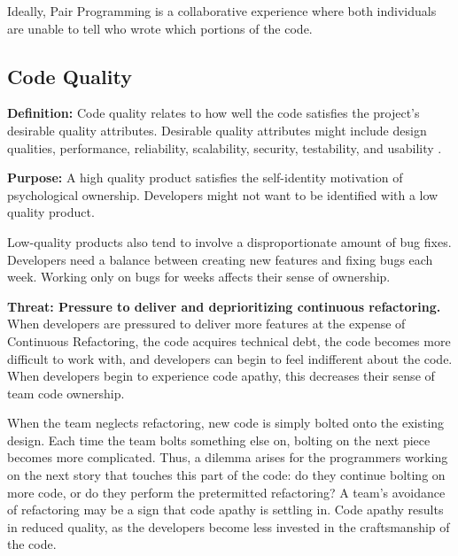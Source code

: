 

Ideally, Pair Programming is a collaborative experience where both individuals are unable to tell who wrote which portions of the code. 

\subsection{Code Quality}
\textbf{Definition:} Code quality relates to how well the code satisfies the project's desirable quality attributes. Desirable quality attributes might include design qualities, performance, reliability, scalability, security,  testability, and usability \cite{Meier2009}. 

\textbf{Purpose:} A high quality product satisfies the self-identity motivation of psychological ownership. Developers might not want to be identified with a low quality product.

Low-quality products also tend to involve a disproportionate amount of bug fixes. Developers need a balance between creating new features and fixing bugs each week. Working only on bugs for weeks affects their sense of ownership.    

\textbf{Threat: Pressure to deliver and deprioritizing continuous refactoring.} When developers are pressured to deliver more features at the expense of Continuous Refactoring, the code acquires technical debt, the code becomes more difficult to work with, and developers can begin to feel indifferent about the code. When developers begin to experience code apathy, this decreases their sense of team code ownership. 

When the team neglects refactoring, new code is simply bolted onto the existing design. Each time the team bolts something else on, bolting on the next piece becomes more complicated. Thus, a dilemma arises for the programmers working on the next story that touches this part of the code: do they continue bolting on more code, or do they perform the pretermitted refactoring? A team's avoidance of refactoring may be a sign that code apathy is settling in. Code apathy results in reduced quality, as the developers become less invested in the craftsmanship of the code.

